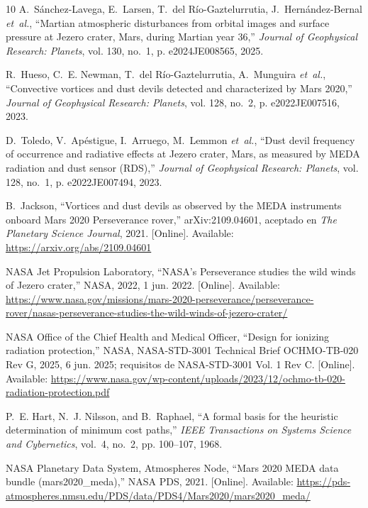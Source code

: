 \documentclass[conference]{IEEEtran}
\begin{document}
\begin{thebibliography}{10}
A.~S{\'a}nchez-Lavega, E.~Larsen, T.~del R{\'i}o-Gaztelurrutia,
  J.~Hern{\'a}ndez-Bernal \emph{et~al.}, ``{Martian} atmospheric disturbances
  from orbital images and surface pressure at {Jezero} crater, {Mars}, during
  {Martian} year 36,'' \emph{Journal of Geophysical Research: Planets}, vol.
  130, no.~1, p. e2024JE008565, 2025.

R.~Hueso, C.~E. Newman, T.~del R{\'i}o-Gaztelurrutia, A.~Munguira
  \emph{et~al.}, ``Convective vortices and dust devils detected and
  characterized by {Mars 2020},'' \emph{Journal of Geophysical Research:
  Planets}, vol. 128, no.~2, p. e2022JE007516, 2023.

D.~Toledo, V.~Ap{\'e}stigue, I.~Arruego, M.~Lemmon \emph{et~al.}, ``Dust devil
  frequency of occurrence and radiative effects at {Jezero} crater, {Mars}, as
  measured by {MEDA} radiation and dust sensor ({RDS}),'' \emph{Journal of
  Geophysical Research: Planets}, vol. 128, no.~1, p. e2022JE007494, 2023.

\BIBentryALTinterwordspacing
B.~Jackson, ``Vortices and dust devils as observed by the {MEDA} instruments
  onboard {Mars 2020 Perseverance} rover,'' arXiv:2109.04601, aceptado en
  \emph{The Planetary Science Journal}, 2021. [Online]. Available:
  \url{https://arxiv.org/abs/2109.04601}
\BIBentrySTDinterwordspacing

\BIBentryALTinterwordspacing
{NASA Jet Propulsion Laboratory}, ``{NASA}'s {Perseverance} studies the wild
  winds of {Jezero} crater,'' NASA, 2022, 1 jun. 2022. [Online]. Available:
  \url{https://www.nasa.gov/missions/mars-2020-perseverance/perseverance-rover/nasas-perseverance-studies-the-wild-winds-of-jezero-crater/}
\BIBentrySTDinterwordspacing

\BIBentryALTinterwordspacing
{NASA Office of the Chief Health and Medical Officer}, ``Design for ionizing
  radiation protection,'' NASA, NASA-STD-3001 Technical Brief OCHMO-TB-020 Rev
  G, 2025, 6 jun. 2025; requisitos de NASA-STD-3001 Vol. 1 Rev C. [Online].
  Available:
  \url{https://www.nasa.gov/wp-content/uploads/2023/12/ochmo-tb-020-radiation-protection.pdf}
\BIBentrySTDinterwordspacing

P.~E. Hart, N.~J. Nilsson, and B.~Raphael, ``A formal basis for the heuristic
  determination of minimum cost paths,'' \emph{IEEE Transactions on Systems
  Science and Cybernetics}, vol.~4, no.~2, pp. 100--107, 1968.

\BIBentryALTinterwordspacing
{NASA Planetary Data System, Atmospheres Node}, ``{Mars 2020 MEDA} data bundle
  (mars2020\_meda),'' NASA PDS, 2021. [Online]. Available:
  \url{https://pds-atmospheres.nmsu.edu/PDS/data/PDS4/Mars2020/mars2020_meda/}
\BIBentrySTDinterwordspacing

\end{thebibliography}
\end{document}
